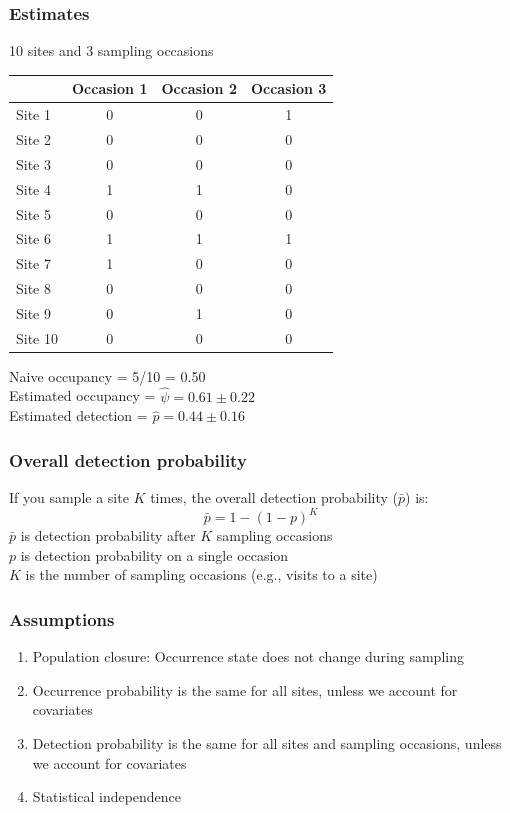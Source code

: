 \documentclass[color=usenames,dvipsnames]{beamer}\usepackage[]{graphicx}\usepackage[]{xcolor}
\begin{document}
\begin{frame}
  \frametitle{Estimates}
  {%
    \centering \large 10 sites and 3 sampling occasions \par}
  \vspace{0.3cm}
  \begin{center}
    \small
    \begin{tabular}{lccc}
      \hline
      & Occasion 1 & Occasion 2 & Occasion 3 \\
      \hline
      Site 1 & 0 & 0 & 1 \\
      Site 2 & 0 & 0 & 0 \\
      Site 3 & 0 & 0 & 0 \\
      Site 4 & 1 & 1 & 0 \\
      Site 5 & 0 & 0 & 0 \\
      Site 6 & 1 & 1 & 1 \\
      Site 7 & 1 & 0 & 0 \\
      Site 8 & 0 & 0 & 0 \\
      Site 9 & 0 & 1 & 0 \\
      Site 10 & 0 & 0 & 0 \\
      \hline
    \end{tabular}
  \end{center}
  Naive occupancy = 5/10 = 0.50 \\
  Estimated occupancy = $\hat{\psi} = 0.61 \pm 0.22$ \\
  Estimated detection = $\hat{p} = 0.44 \pm 0.16$ \\
\end{frame}




\begin{frame}
  \frametitle{Overall detection probability}
  \large
  {\centering If you sample a site $K$ times, the overall detection
    probability ($\bar{p}$) is:}
  \[
    \bar{p} = 1 - (1-p)^K
  \]
  \vfill
  \large
  $\bar{p}$ is detection probability after $K$ sampling occasions \\
  $p$ is detection probability on a single occasion \\
  $K$ is the number of sampling occasions (e.g., visits to a site)
\end{frame}









\begin{frame}
  \frametitle{Assumptions}
  \large
  \begin{enumerate}[<+- | visible@+->][\bf \color{PineGreen} (1)]
    \item Population closure: Occurrence state does not change during sampling
    \item Occurrence probability is the same for all sites, unless we
      account for \alert{covariates}
    \item Detection probability is the same for all sites and sampling
      occasions, unless we account for covariates
    \item Statistical independence
  \end{enumerate}
\end{frame}
\end{document}
